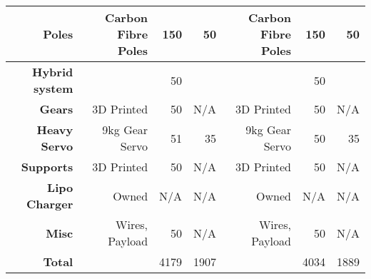 \begin{landscape}
\begin{table}[!htbp]
\begin{tabular}{|r|r|r|r|r|r|r|}
		\hline
		\textbf{Poles} & Carbon Fibre Poles & 150 & 50 & Carbon Fibre Poles & 150 & 50\\
		\hline
		\textbf{Hybrid system} &  & 50 & & & 50 & \\
		\hline
		\textbf{Gears} & 3D Printed & 50 & N/A & 3D Printed & 50 & N/A\\
		\hline
		\textbf{Heavy Servo} & 9kg Gear Servo & 51 & 35 & 9kg Gear Servo & 50 & 35\\
		\hline
		\textbf{Supports} & 3D Printed & 50 & N/A & 3D Printed & 50 & N/A\\
		\hline
		\textbf{Lipo Charger} & Owned & N/A & N/A & Owned & N/A & N/A\\
		\hline
		\textbf{Misc} & Wires, Payload & 50 & N/A & Wires, Payload & 50 & N/A\\
		\hline
		\textbf{Total} & & 4179 & 1907 &  & 4034 & 1889\\
		\hline
	\end{tabular} 
	\label{tab:x8costs}
\end{table}
\end{landscape}

